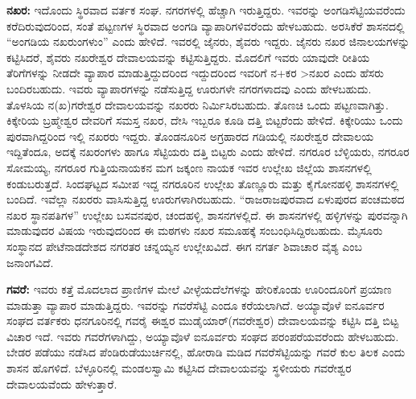 \textbf{ನಖರ:} ಇದೊಂದು ಸ್ಥಿರವಾದ ವರ್ತಕ ಸಂಘ. ನಗರಗಳಲ್ಲಿ ಹೆಚ್ಚಾಗಿ ಇರುತ್ತಿದ್ದರು. ಇವರನ್ನು ಅಂಗಡಿಸೆಟ್ಟಿಯವ\-ರೆಂದು ಕರೆದಿರುವುದರಿಂದ, ಸಂತೆ ಪಟ್ಟಣಗಳ ಸ್ಥಿರವಾದ ಅಂಗಡಿ ವ್ಯಾಪಾರಿಗಳಿವರೆಂದು ಹೇಳಬಹುದು. ಅರಸಿಕೆರೆ ಶಾಸನದಲ್ಲಿ “ಅಂಗಡಿಯ ನಖರುಂಗಳುಂ” ಎಂದು ಹೇಳಿದೆ. ಇವರಲ್ಲಿ ಜೈನರು, ಶೈವರು ಇದ್ದರು. ಜೈನರು ನಖರ ಜಿನಾಲಯಗಳನ್ನು ಕಟ್ಟಿಸಿದರೆ, ಶೈವರು ನಖರೇಶ್ವರ ದೇವಾಲಯವನ್ನು ಕಟ್ಟಿಸುತ್ತಿದ್ದರು. ಮೊದಲಿಗೆ ಇವರು ಯಾವುದೇ ರೀತಿಯ ತೆರಿಗೆಗಳನ್ನು ನೀಡದೇ ವ್ಯಾಪಾರ ಮಾಡುತ್ತಿದ್ದುದರಿಂದ ಇದ್ದುದರಿಂದ ಇವರಿಗೆ ನ+ಕರ \textgreater  ನಖರ ಎಂದು ಹೆಸರು ಬಂದಿರಬಹುದು. ಇವರು ವ್ಯಾಪಾರಗಳನ್ನು ನಡೆಸುತ್ತಿದ್ದ ಊರುಗಳೇ ನಗರಗಳಾದವು ಎಂದು ಹೇಳಬಹುದು. ತೊಳಸಿಯ ನ(ಖ)ಗರೇಶ್ವರ ದೇವಾಲಯವನ್ನು ನಖರರು ನಿರ್ಮಿಸಿರಬಹುದು. ತೊಣಚಿ ಒಂದು ಪಟ್ಟಣವಾಗಿತ್ತು. ಕಿಕ್ಕೇರಿಯ ಬ್ರಹ್ಮೇಶ್ವರ ದೇವರಿಗೆ ಸಮಸ್ತ ನಖರ, ದೇಸಿ ಇಬ್ಬರೂ ಕೂಡಿ ದತ್ತಿ ಬಿಟ್ಟರೆಂದು ಹೇಳಿದೆ. ಕಿಕ್ಕೇರಿಯು ಒಂದು ಪುರವಾಗಿದ್ದರಿಂದ ಇಲ್ಲಿ ನಖರರು ಇದ್ದರು. ತೊಂಡನೂರಿನ ಅಗ್ರಹಾರದ ಗಡಿಯಲ್ಲಿ ನಖರೇಶ್ವರ ದೇವಾಲಯ ಇದ್ದಿತೆಂದೂ, ಅದಕ್ಕೆ ನಖರಂಗಳು ಹಾಗೂ ಸೆಟ್ಟಿಯರು ದತ್ತಿ ಬಿಟ್ಟರು ಎಂದು ಹೇಳಿದೆ. ನಗರೂರ ಬೆಳ್ಳಿಯರು, ನಗರೂರ ಸೋಮಯ್ಯ, ನಗರೂರ ಗುತ್ತಿಯನಾಯಕನ ಮಗ ಜಕ್ಕಂಣ ನಾಯಕ ಇವರ ಉಲ್ಲೇಖ ಜಿಲ್ಲೆಯ ಶಾಸನಗಳಲ್ಲಿ ಕಂಡುಬರುತ್ತದೆ. ಸಿಂದಘಟ್ಟದ ಸಮೀಪ ಇದ್ದ ನಗರೂರಿನ ಉಲ್ಲೇಖ ತೊಣ್ಣೂರು ಮತ್ತು ಕೈಗೋನಹಳ್ಳಿ ಶಾಸನಗಳಲ್ಲಿ ಬಂದಿದೆ. ಇವೆಲ್ಲಾ ನಖರರು ವಾಸಿಸುತ್ತಿದ್ದ ಊರುಗಳಾಗಿರಬಹುದು. “ರಾಜರಾಜಪುರವಾದ ಏಳುಪುರದ ಪಂಚಮಠದ ನಖರ ಸ್ಥಾನಪತಿಗಳ” ಉಲ್ಲೇಖ ಬಸವನಪುರ, ಚಂದಹಳ್ಳಿ, ಶಾಸನಗಳಲ್ಲಿದೆ. ಈ ಶಾಸನಗಳಲ್ಲಿ ಹಳ್ಳಿಗಳನ್ನು ಪುರವನ್ನಾಗಿ ಮಾಡುವುದರ ವಿಷಯ ಇರುವುದರಿಂದ ಈ ಮಠಗಳು ನಖರ ಸಮೂಹಕ್ಕೆ ಸಂಬಂಧಿಸಿದ್ದಿರಬಹುದು. ಮೈಸೂರು ಸಂಸ್ಥಾನದ ಪೇಟೆನಾಡದೇಶದ ನಗರತರ ಚನ್ನಯ್ಯನ ಉಲ್ಲೇಖವಿದೆ.  ಈಗ ನಗರ್ತ ಶಿವಾಚಾರ ವೈಶ್ಯ ಎಂಬ ಜನಾಂಗವಿದೆ.

\textbf{ಗವರೆ:} ಇವರು ಕತ್ತೆ ಮೊದಲಾದ ಪ್ರಾಣಿಗಳ ಮೇಲೆ ವೀಳ್ಳೆಯದೆಲೆಗಳನ್ನು ಹೇರಿಕೊಂಡು ಊರಿಂದೂರಿಗೆ ಪ್ರಯಾಣ ಮಾಡುತ್ತಾ ವ್ಯಾಪಾರ ಮಾಡುತ್ತಿದ್ದರು. ಇವರನ್ನು ಗವರೆಸೆಟ್ಟಿ ಎಂದೂ ಕರೆಯಲಾಗಿದೆ. ಅಯ್ಯಾವೊಳೆ ಐನೂರ್ವರ ಸಂಘದ ವರ್ತಕರು ಧನಗೂರಿನಲ್ಲಿ ಗವರೈ ಈಶ್ವರ ಮುಡೈಯಾರ್​(ಗವರೇಶ್ವರ) ದೇವಾಲಯವನ್ನು ಕಟ್ಟಿಸಿ ದತ್ತಿ ಬಿಟ್ಟ ವಿಚಾರ ಇದೆ. ಇವರು ಗವರೆಗಳಾಗಿದ್ದು, ಅಯ್ಯಾವೊಳೆ ಐನೂರ್ವರು ಸಂಘದ ಪರಂಪರೆಯವರೆಂದು ಹೇಳಬಹುದು. ಬೇಡರ ಪಡೆಯು ನಡೆಸಿದ ಪೆಂಡಿರುಡೆಯುರ್ಚಿನಲ್ಲಿ, ಹೋರಾಡಿ ಮಡಿದ ಗವರೆಸೆಟ್ಟಿಯನ್ನು ಗವರೆ ಕುಲ ತಿಲಕ ಎಂದು ಶಾಸನ ಹೊಗಳಿದೆ. ಬೆಳ್ಳೂರಿನಲ್ಲಿ ಮಂಡಲಸ್ವಾಮಿ ಕಟ್ಟಿಸಿದ ದೇವಾಲಯವನ್ನು ಸ್ಥಳೀಯರು ಗವರೇಶ್ವರ ದೇವಾಲಯವೆಂದು ಹೇಳುತ್ತಾರೆ.

